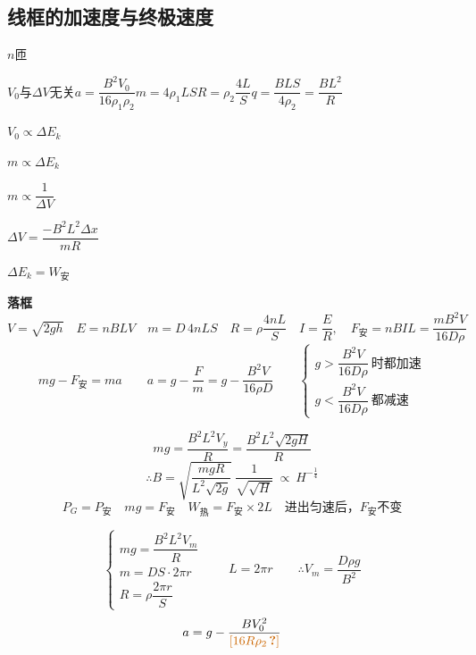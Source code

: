 \subsection{线框的加速度与终极速度}
\quad $n$匝\ 

$V_0$与$\Delta V$无关\qquad $a=\dfrac{B^2V_0}{16\rho_1\rho_2}$\quad $m=4\rho_1LS$\quad $R=\rho_2\dfrac{4L}{S}$\quad $q=\dfrac{BLS}{4\rho_2}=\dfrac{BL^2}{R}$

$V_0\propto\Delta E_k$\qquad {} %

$m\propto\Delta E_k$

$m\propto\dfrac{1}{\Delta V}$

$\Delta V=\dfrac{-B^2L^2\Delta x}{mR}$

$\Delta E_k=W_{\text{安}}$

\textbf{落框}
\[ V=\sqrt{2gh}\quad E=nBLV\quad m=D\,4nLS\quad R=\rho\frac{4nL}{S}\quad I=\frac{E}{R},\quad F_{\text{安}}=nBIL=\frac{mB^2V}{16D\rho} \]
\[ mg-F_{\text{安}}=ma\qquad a=g-\frac{F}{m}=g-\frac{B^2V}{16\rho D}\qquad \left\{\begin{array}{l} g>\dfrac{B^2V}{16D\rho}\ \text{时都加速}\\[2ex] g<\dfrac{B^2V}{16D\rho}\ \text{都减速}\end{array}\right. \] %

\[ mg=\frac{B^2L^2V_y}{R}=\frac{B^2L^2\sqrt{2gH}}{R} \]
\[ \therefore B=\sqrt{\frac{mgR}{L^2\sqrt{2g}}}\ \frac{1}{\sqrt{\sqrt{H}}}\ \propto\ H^{-\frac{1}{4}} \]
\[ P_G=P_{\text{安}}\quad mg=F_{\text{安}}\quad W_{\text{热}}=F_{\text{安}}\times 2L\quad \text{进出匀速后，}F_{\text{安}}\text{不变} \]

\begin{problem}[②]
\begin{solution}
\[ \left\{\begin{array}{l} mg=\dfrac{B^2L^2V_m}{R}\\[2ex] m=DS\cdot 2\pi r\\[1ex] R=\rho\dfrac{2\pi r}{S}\end{array}\right.\qquad L=2\pi r\qquad \therefore V_m=\boxed{\dfrac{D\rho g}{B^2}} \]
\[ a=g-\frac{BV_0^2}{\text{\unclear{$16R\rho_2$}}} \] %
\end{solution}
\end{problem}

